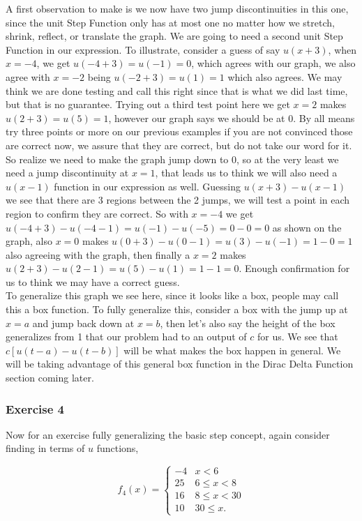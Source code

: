 \documentclass[12pt]{article}
\begin{document}
A first observation to make is we now have two jump discontinuities in this one, since the unit Step Function only has at most one no matter how we stretch, shrink, reflect, or translate the graph. We are going to need a second unit Step Function in our expression. To illustrate, consider a guess of say $u(x+3)$, when $x=-4$, we get $u(-4+3)=u(-1)=0$, which agrees with our graph, we also agree with $x=-2$ being $u(-2+3)=u(1)=1$ which also agrees. We may think we are done testing and call this right since that is what we did last time, but that is no guarantee. Trying out a third test point here we get $x=2$ makes $u(2+3)=u(5)=1$, however our graph says we should be at 0. By all means try three points or more on our previous examples if you are not convinced those are correct now, we assure that they are correct, but do not take our word for it. \\

So realize we need to make the graph jump down to 0, so at the very least we need a jump discontinuity at $x=1$, that leads us to think we will also need a $u(x-1)$ function in our expression as well. Guessing $u(x+3)-u(x-1)$ we see that there are 3 regions between the 2 jumps, we will test a point in each region to confirm they are correct. So with $x=-4$ we get $u(-4+3)-u(-4-1)=u(-1)-u(-5)=0-0=0$ as shown on the graph, also $x=0$ makes $u(0+3)-u(0-1)=u(3)-u(-1)=1-0=1$ also agreeing with the graph, then finally a $x=2$ makes $u(2+3)-u(2-1)=u(5)-u(1)=1-1=0$. Enough confirmation for us to think we may have a correct guess. \\

To generalize this graph we see here, since it looks like a box, people may call this a box function. To fully generalize this, consider a box with the jump up at $x=a$ and jump back down at $x=b$, then let's also say the height of the box generalizes from 1 that our problem had to an output of $c$ for us. We see that $c[u(t-a)-u(t-b)]$ will be what makes the box happen in general. We will be taking advantage of this general box function in the Dirac Delta Function section coming later.

\subsubsection{Exercise 4}

Now for an exercise fully generalizing the basic step concept, again consider finding in terms of $u$ functions,

\begin{equation*}
    f_4(x)=\left\{
        \begin{array}{rl}
            -4 &  x < 6  \\
            25 &  6 \leq x < 8 \\
            16 &  8 \leq x < 30 \\
            10 &  30 \leq x.
        \end{array}
    \right.
\end{equation*}
\end{document}
